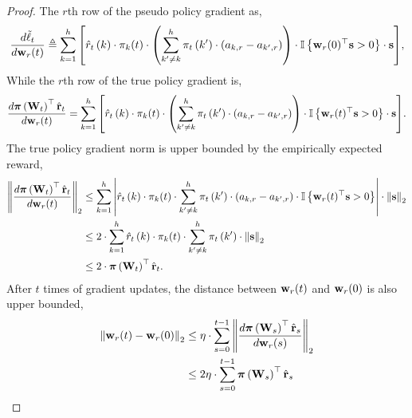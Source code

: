 \begin{proof}
The $r$th row of the pseudo policy gradient as,
\begin{equation*}
	\frac{d \tilde{\ell}_t}{d {\mathbf{w}}_r(t)} \triangleq \sum\limits_{k=1}^{h}{ \left[ \hat{r}_{t}\left(k\right) \cdot \pi_{k}(t) \cdot \left( \sum\limits_{k^\prime \not= k}^{h}{ \pi_{t}\left(k^\prime\right) \cdot \left( a_{k,r} - a_{k^\prime,r} \right)  } \right) \cdot {\mathbb{I}}\left\{ {\mathbf{w}}_r(0)^\top {\mathbf{s}} > 0 \right\} \cdot {\mathbf{s}} \right] },
\end{equation*}
While the $r$th row of the true policy gradient is,
\begin{equation*}
	\frac{d {\boldsymbol{\pi}}\left( {\mathbf{W}}_t \right)^\top \hat{{\mathbf{r}}}_t}{d {\mathbf{w}}_r(t)} = \sum\limits_{k=1}^{h}{ \left[\hat{r}_{t}\left(k\right) \cdot \pi_{k}(t) \cdot \left( \sum\limits_{k^\prime \not= k}^{h}{ \pi_{t}\left(k^\prime\right) \cdot \left( a_{k,r} - a_{k^\prime,r} \right)  } \right) \cdot {\mathbb{I}}\left\{ {\mathbf{w}}_r(t)^\top {\mathbf{s}} > 0 \right\} \cdot {\mathbf{s}} \right] }.
\end{equation*}
The true policy gradient norm is upper bounded by the empirically expected reward,
\begin{equation*}
\begin{split}
	\left\| \frac{d {\boldsymbol{\pi}}\left( {\mathbf{W}}_t \right)^\top \hat{{\mathbf{r}}}_t}{d {\mathbf{w}}_r(t)} \right\|_2 &\le \sum\limits_{k=1}^{h}{ \left|\hat{r}_{t}\left(k\right) \cdot \pi_{k}(t) \cdot \sum\limits_{k^\prime \not= k}^{h}{ \pi_{t}\left(k^\prime\right) \cdot \left( a_{k,r} - a_{k^\prime,r} \right)  } \cdot {\mathbb{I}}\left\{ {\mathbf{w}}_r(t)^\top {\mathbf{s}} > 0 \right\} \right| \cdot \left\| {\mathbf{s}} \right\|_2 } \\
	&\le 2 \cdot \sum\limits_{k=1}^{h}{\hat{r}_{t}\left(k\right) \cdot \pi_{k}(t) \cdot \sum\limits_{k^\prime \not= k}^{h}{ \pi_{t}\left(k^\prime\right)  } \cdot \left\| {\mathbf{s}} \right\|_2  } \\
	&\le 2 \cdot {\boldsymbol{\pi}}\left({\mathbf{W}}_t\right)^\top \hat{{\mathbf{r}}}_t.
\end{split}
\end{equation*}
After $t$ times of gradient updates, the distance between ${\mathbf{w}}_r(t)$ and ${\mathbf{w}}_r(0)$ is also upper bounded,
\begin{equation*}
\begin{split}
	\left\| \rvw_r(t) - \rvw_r(0) \right\|_2 &\le \eta \cdot \sum\limits_{s=0}^{t-1}{\left\| \frac{d \rvpi\left( \rmW_s \right)^\top \hat{\rvr}_s}{d \rvw_r(s)} \right\|_2} \\
	&\le 2 \eta \cdot \sum\limits_{s=0}^{t-1}{ \rvpi\left(\rmW_s\right)^\top \hat{\rvr}_s } \\

\end{split}
\end{equation*}
\end{proof}

